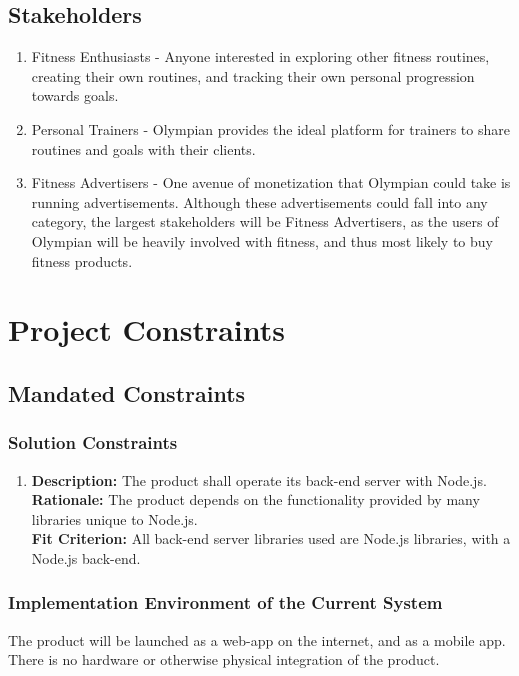 \documentclass[12pt]{article}
\begin{document}
\subsection{Stakeholders}
\begin{enumerate}
	\item Fitness Enthusiasts - Anyone interested in exploring other fitness routines, creating their own routines, and tracking their own personal progression towards goals.
	\item Personal Trainers - Olympian provides the ideal platform for trainers to share routines and goals with their clients.
	\item Fitness Advertisers - One avenue of monetization that Olympian could take is running advertisements. Although these advertisements could fall into any category, the largest stakeholders will be Fitness Advertisers,
	as the users of Olympian will be heavily involved with fitness, and thus most likely to buy fitness products.
\end{enumerate} 

\section{Project Constraints}
\subsection{Mandated Constraints} 
\subsubsection{Solution Constraints}
\begin{enumerate}
	\item
	\textbf{Description: } The product shall operate its back-end server with Node.js. \\
	\textbf{Rationale: } The product depends on the functionality provided by many libraries unique to Node.js. \\
	\textbf{Fit Criterion: } All back-end server libraries used are Node.js libraries, with a Node.js back-end. \\
\end{enumerate}
\subsubsection{Implementation Environment of the Current System}
The product will be launched as a web-app on the internet, and as a mobile app. There is no hardware or otherwise physical integration of the product.
\end{document}
